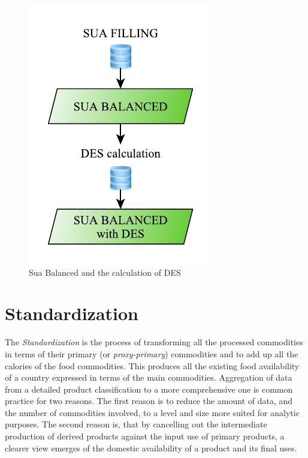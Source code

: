 \documentclass[]{article}
\begin{document}
\begin{figure}[H]

{\centering \includegraphics{images/StandBal/08_SuaBalanced} 

}

\caption{\label{fig:f8}Sua Balanced and the calculation of DES}\label{fig:f8}
\end{figure}

\section{Standardization}\label{standardization}

The \emph{Standardization} is the process of transforming all the
processed commodities in terms of their primary (or
\emph{proxy-primary}) commodities and to add up all the calories of the
food commodities. This produces all the existing food availability of a
country expressed in terms of the main commodities. Aggregation of data
from a detailed product classification to a more comprehensive one is
common practice for two reasons. The first reason is to reduce the
amount of data, and the number of commodities involved, to a level and
size more suited for analytic purposes. The second reason is, that by
cancelling out the intermediate production of derived products against
the input use of primary products, a clearer view emerges of the
domestic availability of a product and its final uses.
\end{document}
